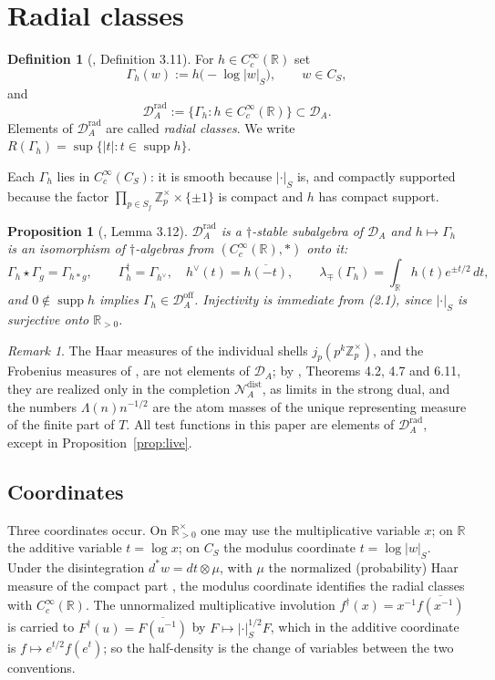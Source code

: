 \documentclass[11pt]{amsart}
\newtheorem{proposition}[theorem]{Proposition}
\theoremstyle{definition}
\newtheorem{definition}[theorem]{Definition}
\theoremstyle{remark}
\newtheorem{remark}[theorem]{Remark}
\newcommand{\R}{\mathbb R}
\newcommand{\Z}{\mathbb Z}
\newcommand{\supp}{\operatorname{supp}}
\newcommand{\DA}{\mathcal D_A}
\newcommand{\DAr}{\mathcal D_A^{\mathrm{rad}}}
\newcommand{\CS}{C_S}
\begin{document}
\section{Radial classes}
\label{sec:radial}

\begin{definition}[\cite{P44}, Definition 3.11]
\label{def:radial}
For $h\in C_c^\infty(\R)$ set
\[
  \Gamma_h(w):=h\bigl(-\log|w|_S\bigr),\qquad w\in\CS ,
\]
and
\[
  \DAr:=\{\Gamma_h:h\in C_c^\infty(\R)\}\subset\DA .
  \tag{3.1}
\]
Elements of $\DAr$ are called \emph{radial classes}.  We write
$R(\Gamma_h)=\sup\{|t|:t\in\supp h\}$.
\end{definition}

Each $\Gamma_h$ lies in $C_c^\infty(\CS)$: it is smooth because
$|\cdot|_S$ is, and compactly supported because the factor
$\prod_{p\in S_f}\Z_p^\times\times\{\pm1\}$ is compact and $h$ has compact
support.

\begin{proposition}[\cite{P44}, Lemma 3.12]
\label{prop:radalg}
$\DAr$ is a $\dagger$-stable subalgebra of $\DA$ and $h\mapsto\Gamma_h$ is an
isomorphism of $\dagger$-algebras from $(C_c^\infty(\R),*)$ onto it:
\[
  \Gamma_h\star\Gamma_g=\Gamma_{h*g},\qquad
  \Gamma_h^\dagger=\Gamma_{h^\vee},\quad h^\vee(t)=\overline{h(-t)},\qquad
  \lambda_\mp(\Gamma_h)=\int_\R h(t)e^{\pm t/2}\,dt ,
  \tag{3.2}
\]
and $0\notin\supp h$ implies $\Gamma_h\in\DA^{\mathrm{off}}$.  Injectivity is
immediate from \emph{(2.1)}, since $|\cdot|_S$ is surjective onto $\R_{>0}$.
\end{proposition}

\begin{remark}
\label{rem:typing}
The Haar measures of the individual shells $j_p(p^k\Z_p^\times)$, and the
Frobenius measures of \cite{P44}, are not elements of $\DA$; by \cite{P44}, Theorems 4.2, 4.7 and 6.11, they are realized only in the completion
$\mathcal N_A^{\mathrm{dist}}$, as limits in the strong dual, and the numbers
$\Lambda(n)n^{-1/2}$ are the atom masses of the unique representing measure of
the finite part of $T$.  All test functions in this paper are elements of
$\DAr$, except in Proposition~\ref{prop:live}.
\end{remark}

\subsection{Coordinates}

Three coordinates occur.  On $\R_{>0}^\times$ one may use the multiplicative
variable $x$; on $\R$ the additive variable $t=\log x$; on $\CS$ the modulus
coordinate $t=\log|w|_S$.  Under the disintegration $d^*w=dt\otimes\mu$, with
$\mu$ the normalized (probability) Haar measure of the compact part
\cite[(10)]{P43}, the modulus coordinate identifies the
radial classes with $C_c^\infty(\R)$.  The unnormalized multiplicative
involution $f^\dagger(x)=x^{-1}\overline{f(x^{-1})}$ is carried to
$F^\dagger(u)=\overline{F(u^{-1})}$ by $F\mapsto|\cdot|_S^{1/2}F$, which in the
additive coordinate is $f\mapsto e^{t/2}f(e^t)$; so the half-density is the
change of variables between the two conventions.
\end{document}

